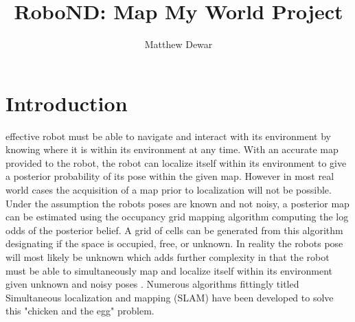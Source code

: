 \documentclass[10pt,journal,compsoc]{IEEEtran}
\begin{document}
\title{RoboND: Map My World Project}

\author{Matthew Dewar}

%
{}


\maketitle
\IEEEdisplaynontitleabstractindextext
\IEEEpeerreviewmaketitle
\section{Introduction}
\label{sec:introduction}

 effective robot must be able to navigate and interact with its environment by knowing where it is within its environment at any time. With an accurate map provided to the robot, the robot can localize itself within its environment to give a posterior probability of its pose within the given map. However in most real world cases the acquisition of a map prior to localization will not be possible. Under the assumption the robots poses are known and not noisy, a posterior map can be estimated using the occupancy grid mapping algorithm computing the log odds of the posterior belief. A grid of cells can be generated from this algorithm designating if the space is occupied, free, or unknown. In reality the robots pose will most likely be unknown which adds further complexity in that the robot must be able to simultaneously map and localize itself within its environment given unknown and noisy poses \cite{UdacityLesson15}. Numerous algorithms fittingly titled Simultaneous localization and mapping (SLAM) have been developed to solve this "chicken and the egg" problem.
\end{document}
